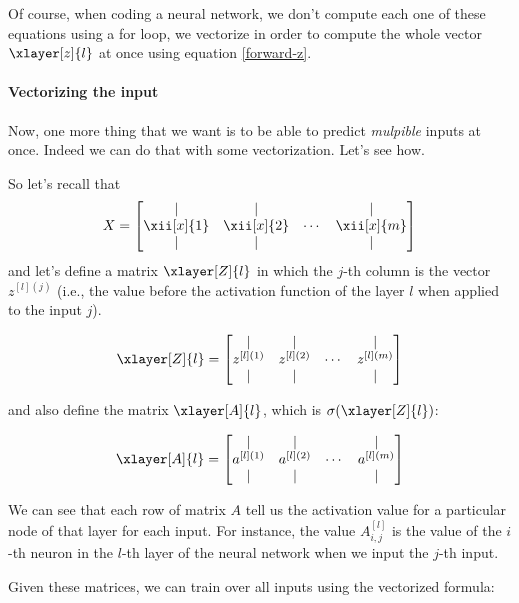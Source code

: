 \documentclass[12pt, a4paper, oneside]{book}
\begin{document}
Of course, when coding a neural network, we don't compute each one of these
equations using a for loop, we vectorize in order to compute the whole vector
$\xlayer[z]{l}$ at once using equation \ref{forward-z}.

\paragraph{Vectorizing the input}%
\label{par:vectorizing_the_input}

Now, one more thing that we want is to be able to predict \textit{mulpible}
inputs at once. Indeed we can do that with some vectorization. Let's see how.

So let's recall that
\[
X = \begin{bmatrix}
    | & | &  & | \\
    \xii[x]{1} & \xii[x]{2} & \cdots & \xii[x]{m} \\
    | & | &  & | \\
    \end{bmatrix}
\]
and let's define a matrix $\xlayer[Z]{l}$ in which the $j$-th column is the
vector $z^{[l](j)}$ (i.e., the value before the activation function of the layer
$l$ when applied to the input $j$).

\[
\xlayer[Z]{l} = \begin{bmatrix}
    | & | &  & | \\
    z^{[l](1)} & z^{[l](2)} & \cdots & z^{[l](m)} \\
    | & | &  & | \\
    \end{bmatrix}
\]

and also define the matrix $\xlayer[A]{l}$, which is $\sigma(\xlayer[Z]{l})$:

\[
\xlayer[A]{l} = \begin{bmatrix}
    | & | &  & | \\
    a^{[l](1)} & a^{[l](2)} & \cdots & a^{[l](m)} \\
    | & | &  & | \\
    \end{bmatrix}
\]

We can see that each row of matrix $A$ tell us the activation value for a
particular node of that layer for each input. For instance, the value
$A^{[l]}_{i,j}$ is the value of the $i$-th neuron in the $l$-th layer of the
neural network when we input the $j$-th input.

Given these matrices, we can train over all inputs using the vectorized formula:
\end{document}
